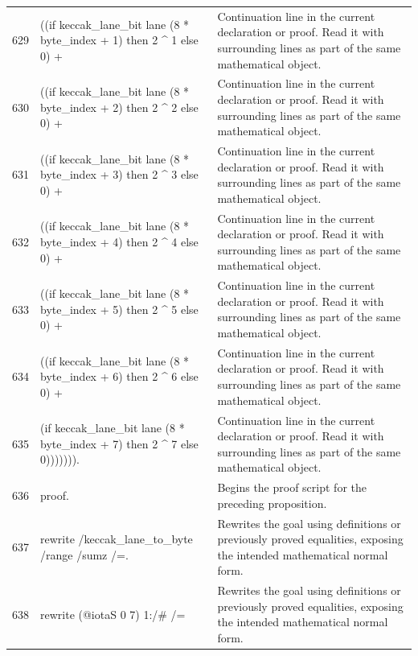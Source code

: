 \documentclass[10pt]{article}
\begin{document}
\begin{longtable}{r L{0.53\textwidth} L{0.37\textwidth}}
629 & {\ttfamily\scriptsize   ((if keccak\_lane\_bit lane (8 * byte\_index + 1) then 2 \textasciicircum{} 1 else 0) +} & Continuation line in the current declaration or proof.  Read it with surrounding lines as part of the same mathematical object. \\
630 & {\ttfamily\scriptsize   ((if keccak\_lane\_bit lane (8 * byte\_index + 2) then 2 \textasciicircum{} 2 else 0) +} & Continuation line in the current declaration or proof.  Read it with surrounding lines as part of the same mathematical object. \\
631 & {\ttfamily\scriptsize   ((if keccak\_lane\_bit lane (8 * byte\_index + 3) then 2 \textasciicircum{} 3 else 0) +} & Continuation line in the current declaration or proof.  Read it with surrounding lines as part of the same mathematical object. \\
632 & {\ttfamily\scriptsize   ((if keccak\_lane\_bit lane (8 * byte\_index + 4) then 2 \textasciicircum{} 4 else 0) +} & Continuation line in the current declaration or proof.  Read it with surrounding lines as part of the same mathematical object. \\
633 & {\ttfamily\scriptsize   ((if keccak\_lane\_bit lane (8 * byte\_index + 5) then 2 \textasciicircum{} 5 else 0) +} & Continuation line in the current declaration or proof.  Read it with surrounding lines as part of the same mathematical object. \\
634 & {\ttfamily\scriptsize   ((if keccak\_lane\_bit lane (8 * byte\_index + 6) then 2 \textasciicircum{} 6 else 0) +} & Continuation line in the current declaration or proof.  Read it with surrounding lines as part of the same mathematical object. \\
635 & {\ttfamily\scriptsize    (if keccak\_lane\_bit lane (8 * byte\_index + 7) then 2 \textasciicircum{} 7 else 0))))))).} & Continuation line in the current declaration or proof.  Read it with surrounding lines as part of the same mathematical object. \\
636 & {\ttfamily\scriptsize proof.} & Begins the proof script for the preceding proposition. \\
637 & {\ttfamily\scriptsize rewrite /keccak\_lane\_to\_byte /range /sumz /=.} & Rewrites the goal using definitions or previously proved equalities, exposing the intended mathematical normal form. \\
638 & {\ttfamily\scriptsize rewrite (@iotaS 0 7) 1:/\# /=} & Rewrites the goal using definitions or previously proved equalities, exposing the intended mathematical normal form. \\

\end{longtable}
\end{document}
